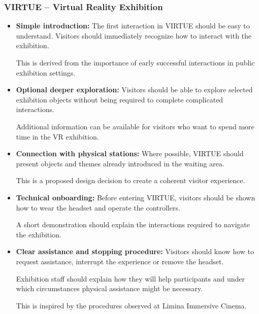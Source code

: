 \subsubsection{VIRTUE -- Virtual Reality Exhibition}

\begin{itemize}

    \item \textbf{Simple introduction:}
    The first interaction in VIRTUE should be easy to understand.
    Visitors should immediately recognize how to interact
    with the exhibition.

    This is derived from the importance of early successful
    interactions in public exhibition settings.
    \cite[pp.~139--141]{hornecker_learning_2006}

    \item \textbf{Optional deeper exploration:}
    Visitors should be able to explore selected exhibition
    objects without being required to complete complicated
    interactions.

    Additional information can be available for visitors
    who want to spend more time in the VR exhibition.
    \cite[p.~141]{hornecker_learning_2006}

    \item \textbf{Connection with physical stations:}
    Where possible, VIRTUE should present objects and themes
    already introduced in the waiting area.

    This is a proposed design decision to create a coherent
    visitor experience.

    \item \textbf{Technical onboarding:}
    Before entering VIRTUE, visitors should be shown how
    to wear the headset and operate the controllers.

    A short demonstration should explain the interactions
    required to navigate the exhibition.
    \cite[pp.~101--102]{whittaker_onboarding_2025}

    \item \textbf{Clear assistance and stopping procedure:}
    Visitors should know how to request assistance,
    interrupt the experience or remove the headset.

    Exhibition staff should explain how they will help
    participants and under which circumstances physical
    assistance might be necessary.

    This is inspired by the procedures observed at
    Limina Immersive Cinema.
    \cite[pp.~90--91]{whittaker_onboarding_2025}


\end{itemize}

